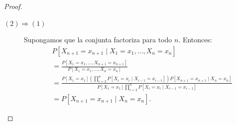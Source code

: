 \documentclass[12pt]{article}
\begin{document}
\begin{proof}
\begin{description}
    \item[$(2) \Longrightarrow (1)$] Supongamos que la conjunta factoriza para todo $n$. Entonces:
    \begin{align*}
      &P[X_{n+1} = x_{n+1} \mid X_1 = x_1, \ldots, X_n = x_n] \\
      &= \frac{P[X_1 = x_1, \ldots, X_{n+1} = x_{n+1}]}{P[X_1 = x_1, \ldots, X_n = x_n]} \\
      &= \frac{P[X_1 = x_1] \left(\prod\limits_{i=2}^{n} P[X_i = x_i \mid X_{i-1} = x_{i-1}]\right) P[X_{n+1} = x_{n+1} \mid X_n = x_n]}{P[X_1 = x_1] \prod\limits_{i=2}^{n} P[X_i = x_i \mid X_{i-1} = x_{i-1}]} \\
      &= P[X_{n+1} = x_{n+1} \mid X_n = x_n].
    \end{align*}
  \end{description}
\end{proof}
\end{document}
